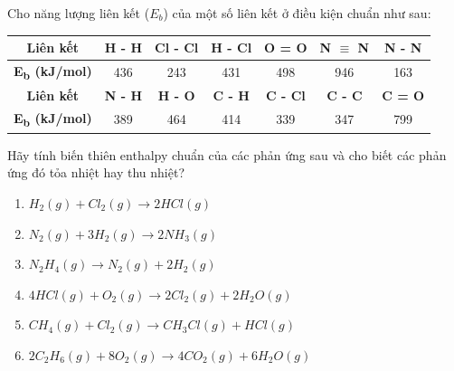 \documentclass[Main.tex]{subfiles}
\begin{document}
\begin{bt}
	Cho năng lượng liên kết ($E_b$) của một số liên kết ở điều kiện chuẩn như sau:
	\begin{center}
		\begin{longtable}{|c|c|c|c|c|c|c|}
			\hline
			\textbf{Liên kết} & \textbf{H - H} & \textbf{Cl - Cl} & \textbf{H - Cl} & \textbf{O = O} & \textbf{N $\equiv$ N} & \textbf{N - N} \\
			\hline
			\textbf{E\textsubscript{b} (kJ/mol)} & 436 & 243 & 431 & 498 & 946 & 163 \\
			\hline
			\textbf{Liên kết} & \textbf{N - H} & \textbf{H - O} & \textbf{C - H} & \textbf{C - Cl} & \textbf{C - C} & \textbf{C = O} \\
			\hline
			\textbf{E\textsubscript{b} (kJ/mol)} & 389 & 464 & 414 & 339 & 347 & 799 \\
			\hline
		\end{longtable}
	\end{center}
	Hãy tính biến thiên enthalpy chuẩn của các phản ứng sau và cho biết các phản ứng đó tỏa nhiệt hay thu nhiệt?
	\begin{enumerate}
		\item $H_2(g) + Cl_2(g) \longrightarrow 2HCl(g)$
		\item $N_2(g) + 3H_2(g) \longrightarrow 2NH_3(g)$
		\item $N_2H_4(g) \longrightarrow N_2(g) + 2H_2(g)$
		\item $4HCl(g) + O_2(g) \longrightarrow 2Cl_2(g) + 2H_2O(g)$
		\item $CH_4(g) + Cl_2(g) \longrightarrow CH_3Cl(g) + HCl(g)$
		\item $2C_2H_6(g) + 8O_2(g) \longrightarrow 4CO_2(g) + 6H_2O(g)$
	\end{enumerate}
\end{bt}
\end{document}
